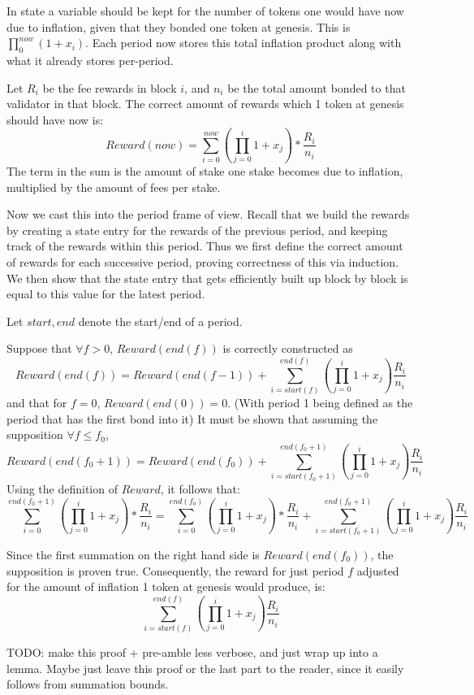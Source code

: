 \documentclass[]{article}
\begin{document}
In state a variable should be kept for the number of tokens one would have now due to inflation,
given that they bonded one token at genesis.
This is $\prod_{0}^{now} (1 + x_i)$.
Each period now stores this total inflation product along with what it already stores per-period.

Let $R_i$ be the fee rewards in block $i$, and $n_i$ be the total amount bonded to that validator in that block.
The correct amount of rewards which 1 token at genesis should have now is:
$$Reward(now) = \sum_{i = 0}^{now}\left(\prod_{j = 0}^{i} 1 + x_j \right) * \frac{R_i}{n_i}$$
The term in the sum is the amount of stake one stake becomes due to inflation, multiplied by the amount of fees per stake.

Now we cast this into the period frame of view.
Recall that we build the rewards by creating a state entry for the rewards of the previous period, and keeping track of the rewards within this period.
Thus we first define the correct amount of rewards for each successive period, proving correctness of this via induction.
We then show that the state entry that gets efficiently built up block by block is equal to this value for the latest period.

Let $start, end$ denote the start/end of a period.

Suppose that $\forall f > 0$, $Reward(end(f))$ is correctly constructed as
$$Reward(end(f)) = Reward(end(f-1)) + \sum_{i = start(f)}^{end(f)}\left(\prod_{j = 0}^{i} 1 + x_j \right) \frac{R_i}{n_i}$$
and that for $f = 0$, $Reward(end(0)) = 0$.
(With period 1 being defined as the period that has the first bond into it)
It must be shown that assuming the supposition $\forall f \leq f_0$, $$Reward(end(f_0 + 1)) = Reward(end(f_0)) + \sum_{i = start(f_0 + 1)}^{end(f_0 + 1)}\left(\prod_{j = 0}^{i} 1 + x_j \right) \frac{R_i}{n_i}$$
Using the definition of $Reward$, it follows that:
$$\sum_{i = 0}^{end(f_0 + 1)}\left(\prod_{j = 0}^{i} 1 + x_j \right) * \frac{R_i}{n_i} = \sum_{i = 0}^{end(f_0)}\left(\prod_{j = 0}^{i} 1 + x_j \right) * \frac{R_i}{n_i} + \sum_{i = start(f_0 + 1)}^{end(f_0 + 1)}\left(\prod_{j = 0}^{i} 1 + x_j \right) \frac{R_i}{n_i}$$

Since the first summation on the right hand side is $Reward(end(f_0))$, the supposition is proven true.
Consequently, the reward for just period $f$ adjusted for the amount of inflation 1 token at genesis would produce, is:
$$\sum_{i = start(f)}^{end(f)}\left(\prod_{j = 0}^{i} 1 + x_j \right) \frac{R_i}{n_i}$$

TODO: make this proof + pre-amble less verbose, and just wrap up into a lemma. 
Maybe just leave this proof or the last part to the reader, since it easily follows from summation bounds.
\end{document}

